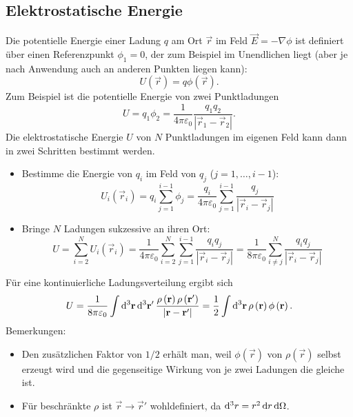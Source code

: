 \subsection{Elektrostatische Energie}

Die potentielle Energie einer Ladung $q$ am Ort $\vec {r}$ im Feld $\vec {E}=-\nabla \phi $ ist definiert über einen Referenzpunkt $\phi _{1}=0$, der zum Beispiel im Unendlichen liegt (aber je nach Anwendung auch an anderen Punkten liegen kann):
\begin{equation}
	\label{3.11}
	U\left(\vec {r}\right)=q\phi \left(\vec {r}\right).
\end{equation}
Zum Beispiel ist die potentielle Energie von zwei Punktladungen
\begin{equation*}
	U=q_{1}\phi _{2}=\frac{1}{4\pi \varepsilon _{0}}\frac{q_{1}q_{2}}{\left| \vec {r}_{1}-\vec {r}_{2}\right| }.
\end{equation*}
Die elektrostatische Energie $U$ von $N$ Punktladungen im eigenen Feld kann dann in zwei Schritten bestimmt werden.
\begin{itemize}
	\item Bestimme die Energie von $q_{i}$ im Feld von $q_{j}$ ($j=1,\ldots ,i-1$):
	      \begin{equation*}
		      U_{i}\left(\vec {r}_{i}\right)=q_{i}\sum _{j=1}^{i-1}\phi _{j}=\frac{q_{i}}{4\pi \varepsilon _{0}}\sum _{j=1}^{i-1}\frac{q_{j}}{\left| \vec {r}_{i}-\vec {r}_{j}\right| }
	      \end{equation*}
	\item Bringe $N$ Ladungen sukzessive an ihren Ort:
	      \begin{equation*}
		      U=\sum _{i=2}^{N}U_{i}\left(\vec {r}_{i}\right)=\frac{1}{4\pi \varepsilon _{0}}\sum _{i=2}^{N}\sum _{j=1}^{i-1}\frac{q_{i}q_{j}}{\left| \vec {r}_{i}-\vec {r}_{j}\right| }=\frac{1}{8\pi \varepsilon _{0}}\sum _{i\neq j}^{N}\frac{q_{i}q_{j}}{\left| \vec {r}_{i}-\vec {r}_{j}\right| }
	      \end{equation*}

\end{itemize}
Für eine kontinuierliche Ladungsverteilung ergibt sich
\begin{equation*}
	U=\frac{1}{8\pi \varepsilon _{0}}\int \diffa[3]{\vec{r}}\diffa[3]{\vec{r}'}\frac{\rho \left(\vec {r}\right)\rho \left(\vec {r}'\right)}{\left| \vec {r}-\vec {r}'\right| }=\frac{1}{2}\int \diffa[3]{\vec{r}}\rho \left(\vec {r}\right)\phi \left(\vec {r}\right).
\end{equation*}
Bemerkungen:
\begin{itemize}
	\item Den zusätzlichen Faktor von $1/2$ erhält man, weil $\phi \left(\vec {r}\right)$ von $\rho \left(\vec {r}\right)$ selbst erzeugt wird und die gegenseitige Wirkung von je zwei Ladungen die gleiche ist.

	\item Für beschränkte $\rho $ ist $\vec {r}\rightarrow \vec {r}'$ wohldefiniert, da $\diff ^{3}r=r^{2}\diff r\diff \Omega  $.


\end{itemize}
